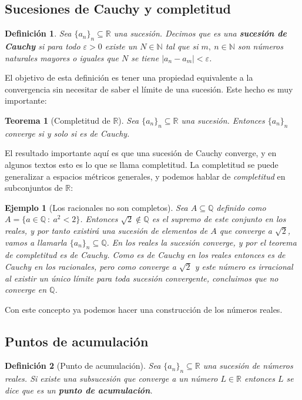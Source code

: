 \documentclass{article}
\newtheorem{theorem}{Teorema}
\newtheorem{define}{Definición}
\newtheorem{ejem}{Ejemplo}
\newcommand{\reales}{\mathbb{R}}
\newcommand{\naturales}{\mathbb{N}}
\newcommand{\racionales}{\mathbb{Q}}
\newcommand{\sucesion}[1]{\{ #1 _n \}_n}
\newcommand{\sucreal}[1]{\{ #1 _n \}_n \subseteq \reales}
\begin{document}
\subsection{Sucesiones de Cauchy y completitud}
\begin{define}
	Sea $\sucreal{a}$ una sucesión. Decimos que es una \textbf{sucesión de Cauchy} si para todo $\varepsilon > 0$ existe un $N \in \naturales$ tal que si $m,\ n \in \naturales$ son números naturales mayores o iguales que $N$ se tiene $|a_n - a_m| < \varepsilon$.
\end{define}
El objetivo de esta definición es tener una propiedad equivalente a la convergencia sin necesitar de saber el límite de una sucesión. Este hecho es muy importante:
\begin{theorem}[Completitud de $\reales$]
	Sea $\sucreal{a}$ una sucesión. Entonces $\sucesion{a}$ converge si y solo si es de Cauchy.
\end{theorem}
El resultado importante aquí es que una sucesión de Cauchy converge, y en algunos textos esto es lo que se llama completitud.
La completitud se puede generalizar a espacios métricos generales, y podemos hablar de \textit{completitud} en subconjuntos de $\reales$:
\begin{ejem}[Los racionales no son completos]
	Sea $A \subseteq \racionales$ definido como $A = \{ a\in \racionales\ :\ a^2 < 2\}$. Entonces $\sqrt{2} \not\in \racionales$ es el supremo de este conjunto en los reales, y por tanto existirá una sucesión de elementos de $A$ que converge a $\sqrt{2}$, vamos a llamarla $\sucesion{a} \subseteq \racionales$. En los reales la sucesión converge, y por el teorema de completitud es de Cauchy. Como es de Cauchy en los reales entonces es de Cauchy en los racionales, pero como converge a $\sqrt{2}$ y este número es irracional al existir un único límite para toda sucesión convergente, concluimos que no converge en $\racionales$.
\end{ejem}
Con este concepto ya podemos hacer una construcción de los números reales.



\subsection{Puntos de acumulación}
\begin{define}[Punto de acumulación]
	Sea $\sucreal{a}$ una sucesión de números reales. Si existe una subsucesión que converge a un número $L \in \reales$ entonces $L$ se dice que es un \textbf{punto de acumulación}.
\end{define}
\end{document}
